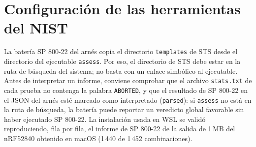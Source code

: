 \section{Configuración de las herramientas del NIST}

La batería SP 800-22 del arnés copia el directorio \texttt{templates} de STS desde el directorio del ejecutable \texttt{assess}. Por eso, el directorio de STS debe estar en la ruta de búsqueda del sistema; no basta con un enlace simbólico al ejecutable. Antes de interpretar un informe, conviene comprobar que el archivo \texttt{stats.txt} de cada prueba no contenga la palabra \texttt{ABORTED}, y que el resultado de SP 800-22 en el JSON del arnés esté marcado como interpretado (\texttt{parsed}): si \texttt{assess} no está en la ruta de búsqueda, la batería puede reportar un veredicto global favorable sin haber ejecutado SP 800-22. La instalación usada en WSL se validó reproduciendo, fila por fila, el informe de SP 800-22 de la salida de 1\,MB del nRF52840 obtenido en macOS (1\,440 de 1\,452 combinaciones).
